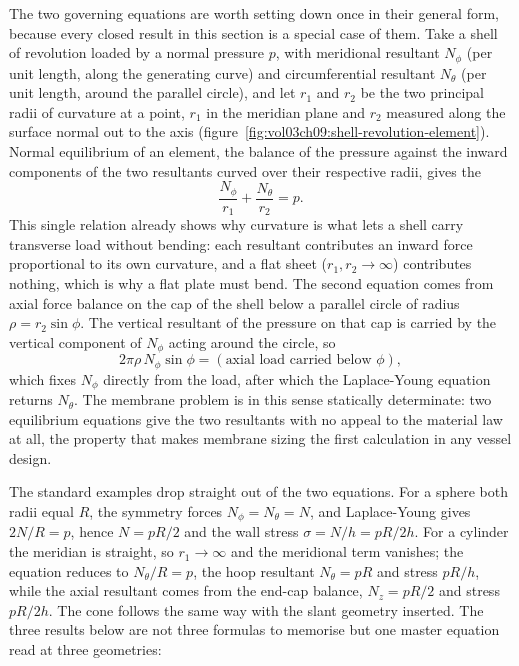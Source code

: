 The two governing equations are worth setting down once in their
general form, because every closed result in this section is a special
case of them. Take a shell of revolution loaded by a normal pressure
$p$, with meridional resultant $N_\phi$ (per unit length, along the
generating curve) and circumferential resultant $N_\theta$ (per unit
length, around the parallel circle), and let $r_1$ and $r_2$ be the two
principal radii of curvature at a point, $r_1$ in the meridian plane
and $r_2$ measured along the surface normal out to the axis
(figure~\ref{fig:vol03ch09:shell-revolution-element}). Normal
equilibrium of an element, the balance of the pressure against the
inward components of the two resultants curved over their respective
radii, gives the 
\[
\frac{N_\phi}{r_1} + \frac{N_\theta}{r_2} = p .
\]
This single relation already shows why curvature is what lets a shell
carry transverse load without bending: each resultant contributes an
inward force proportional to its own curvature, and a flat sheet
($r_1, r_2 \to \infty$) contributes nothing, which is why a flat plate
must bend. The second equation comes from axial force balance on the
cap of the shell below a parallel circle of radius $\rho = r_2\sin\phi$.
The vertical resultant of the pressure on that cap is carried by the
vertical component of $N_\phi$ acting around the circle, so
\[
2\pi \rho\, N_\phi \sin\phi = (\text{axial load carried below } \phi),
\]
which fixes $N_\phi$ directly from the load, after which the
Laplace-Young equation returns $N_\theta$. The membrane problem is in
this sense statically determinate: two equilibrium equations give the
two resultants with no appeal to the material law at all, the property
that makes membrane sizing the first calculation in any vessel design.



The standard examples drop straight out of the two equations. For a
sphere both radii equal $R$, the symmetry forces $N_\phi = N_\theta = N$,
and Laplace-Young gives $2N/R = p$, hence $N = pR/2$ and the wall stress
$\sigma = N/h = pR/2h$. For a cylinder the meridian is straight, so
$r_1 \to \infty$ and the meridional term vanishes; the equation reduces
to $N_\theta/R = p$, the hoop resultant $N_\theta = pR$ and stress
$pR/h$, while the axial resultant comes from the end-cap balance,
$N_z = pR/2$ and stress $pR/2h$. The cone follows the same way with the
slant geometry inserted. The three results below are not three formulas
to memorise but one master equation read at three geometries:

